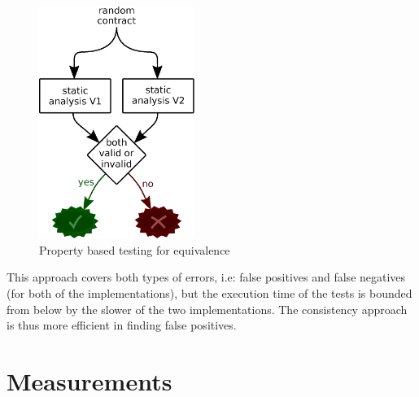 \documentclass[english,runningheads]{llncs}
\begin{document}
\begin{figure}
\begin{centering}
\includegraphics[width=0.45\textwidth]{figures/equivalence_property}
\par\end{centering}
\caption{Property based testing for equivalence\label{fig:Property-based-testing-for-equivalence}}
\end{figure}

This approach covers both types of errors, i.e: false positives and
false negatives (for both of the implementations), but the execution
time of the tests is bounded from below by the slower of the two implementations.
The consistency approach is thus more efficient in finding false positives.

\section{Measurements \label{sec:Measurements} }
\end{document}
